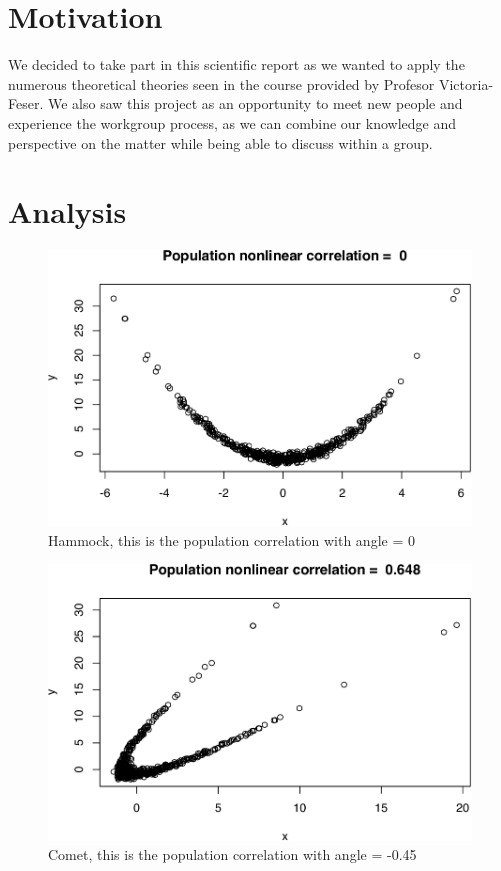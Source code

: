 \documentclass[11pt,]{article}
\begin{document}
\hypertarget{motivation}{%
\section{Motivation}\label{motivation}}

We decided to take part in this scientific report as we wanted to apply
the numerous theoretical theories seen in the course provided by
Profesor Victoria-Feser. We also saw this project as an opportunity to
meet new people and experience the workgroup process, as we can combine
our knowledge and perspective on the matter while being able to discuss
within a group.

\hypertarget{analysis}{%
\section{Analysis}\label{analysis}}

\begin{figure}

{\centering \includegraphics[width=0.5\linewidth]{RapportSTAT_files/figure-latex/nonlinear_q1-1} 

}

\caption{Hammock, this is the population correlation with angle = 0}\label{fig:nonlinear_q1}
\end{figure}

\begin{figure}

{\centering \includegraphics[width=0.5\linewidth]{RapportSTAT_files/figure-latex/nonlinear_q2-1} 

}

\caption{Comet, this is the population correlation with angle = -0.45}\label{fig:nonlinear_q2}
\end{figure}
\end{document}
